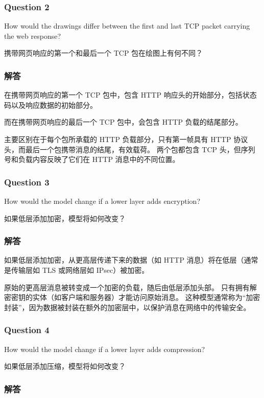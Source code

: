 \documentclass[14pt,a4paper,UTF8,twoside]{article}
\begin{document}
\subsubsection{Question 2}

How would the drawings differ between the first and last TCP packet carrying the web response?

携带网页响应的第一个和最后一个 TCP 包在绘图上有何不同？

\subsubsection*{解答}

在携带网页响应的第一个 TCP 包中，包含 HTTP 响应头的开始部分，包括状态码以及响应数据的初始部分。

而在携带网页响应的最后一个 TCP 包中，会包含 HTTP 负载的结尾部分。

主要区别在于每个包所承载的 HTTP 负载部分，只有第一帧具有 HTTP 协议头，而最后一个包携带消息的结尾，有效载荷。
两个包都包含 TCP 头，但序列号和负载内容反映了它们在 HTTP 消息中的不同位置。

\subsubsection{Question 3}
How would the model change if a lower layer adds encryption?

如果低层添加加密，模型将如何改变？

\subsubsection*{解答}

如果低层添加加密，从更高层传递下来的数据（如 HTTP 消息）将在低层（通常是传输层如 TLS 或网络层如 IPsec）被加密。

原始的更高层消息被转变成一个加密的负载，随后由低层添加头部。
只有拥有解密密钥的实体（如客户端和服务器）才能访问原始消息。
这种模型通常称为“加密封装”，因为数据被封装在额外的加密层中，以保护消息在网络中的传输安全。

\subsubsection{Question 4}
How would the model change if a lower layer adds compression?

如果低层添加压缩，模型将如何改变？

\subsubsection*{解答}
\end{document}
